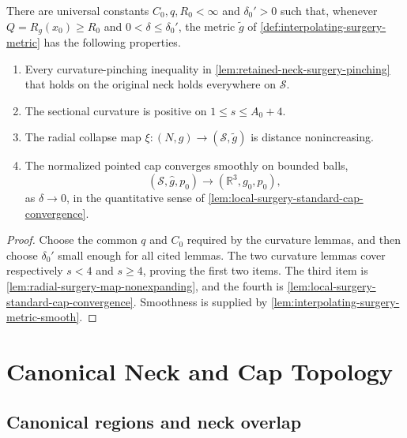 \begin{theorem}
\label{thm:local-neck-surgery}
\notready
There are universal constants $C_0,q,R_0<\infty$ and $\delta_0'>0$ such
that, whenever $Q=R_g(x_0)\ge R_0$ and
$0<\delta\le\delta_0'$, the metric $\widetilde g$ of
\ref{def:interpolating-surgery-metric} has the following properties.
\begin{enumerate}
\item Every curvature-pinching inequality in
      \ref{lem:retained-neck-surgery-pinching} that holds on the original
      neck holds everywhere on $\mathcal S$.
\item The sectional curvature is positive on
      $1\le s\le A_0+4$.
\item The radial collapse map
      $\xi\colon(N,g)\to(\mathcal S,\widetilde g)$ is distance
      nonincreasing.
\item The normalized pointed cap converges smoothly on bounded balls,
      \[
        (\mathcal S,\widehat g,p_0)\longrightarrow
        (\mathbb R^3,g_0,p_0),
      \]
      as $\delta\to0$, in the quantitative sense of
      \ref{lem:local-surgery-standard-cap-convergence}.
\end{enumerate}
\end{theorem}

\begin{proof}
Choose the common $q$ and $C_0$ required by the curvature lemmas, and then
choose $\delta_0'$ small enough for all cited lemmas.  The two curvature
lemmas cover respectively $s<4$ and $s\ge4$, proving the first two items.
The third item is \ref{lem:radial-surgery-map-nonexpanding}, and the fourth
is \ref{lem:local-surgery-standard-cap-convergence}.  Smoothness is supplied
by \ref{lem:interpolating-surgery-metric-smooth}.
\end{proof}

\section{Canonical Neck and Cap Topology}

\subsection{Canonical regions and neck overlap}

